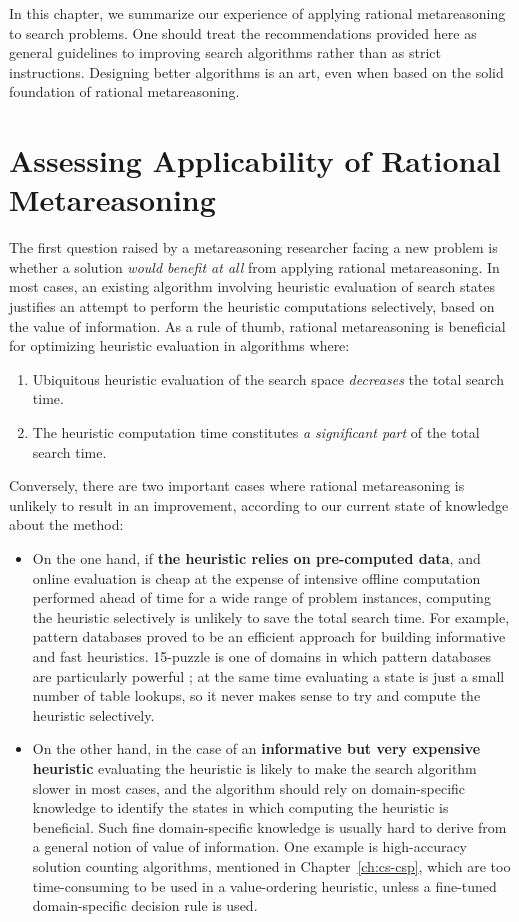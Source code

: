 In this chapter, we summarize our experience of applying rational
metareasoning to search problems. One should treat the recommendations
provided here as general guidelines to improving search algorithms
rather than as strict instructions. Designing better algorithms is an
art, even when based on the solid foundation of rational
metareasoning.

\section{Assessing Applicability of Rational Metareasoning}

The first question raised by a metareasoning researcher facing a new
problem is whether a solution \emph{would benefit at all} from
applying rational metareasoning. In most cases, an existing algorithm
involving heuristic evaluation of search states justifies an attempt
to perform the heuristic computations selectively, based on the value
of information. As a rule of thumb, rational metareasoning is beneficial for
optimizing heuristic evaluation in algorithms where:
\begin{enumerate}
\item Ubiquitous heuristic evaluation of the search space \emph{decreases} the total search
  time.
\item The heuristic computation time constitutes \emph{a significant part} of
  the total search time. 
\end{enumerate}

Conversely, there are two important cases where rational metareasoning
is unlikely to result in an improvement, according to our current state
of knowledge about the method: 

\begin{itemize}
\item On the one hand, if \textbf{the heuristic relies on pre-computed
  data}, and online evaluation is cheap at the expense of intensive
  offline computation performed ahead of time for a wide
  range of problem instances, computing the heuristic selectively is
  unlikely to save the total search time. For example, pattern
  databases \cite{pattern} proved to be an efficient approach for
  building informative and fast heuristics. 15-puzzle is one of
  domains in which pattern databases are particularly powerful
  \cite{Felner.apdb}; at the same time evaluating a state is just a
  small number of table lookups, so it never makes sense to try and
  compute the heuristic selectively.
\item On the other hand, in the case of an \textbf{informative but
  very expensive heuristic} evaluating the heuristic is likely 
  to make the search algorithm slower in most cases, and the
  algorithm should rely on domain-specific knowledge to
  identify the states in which computing the heuristic is beneficial. 
  Such fine domain-specific knowledge is usually hard to derive from
  a general notion of value of information. One example is
  high-accuracy solution counting algorithms, mentioned in
  Chapter~\ref{ch:cs-csp}, which are too time-consuming to be used
  in a value-ordering heuristic, unless a fine-tuned domain-specific
  decision rule is used.
\end{itemize}

